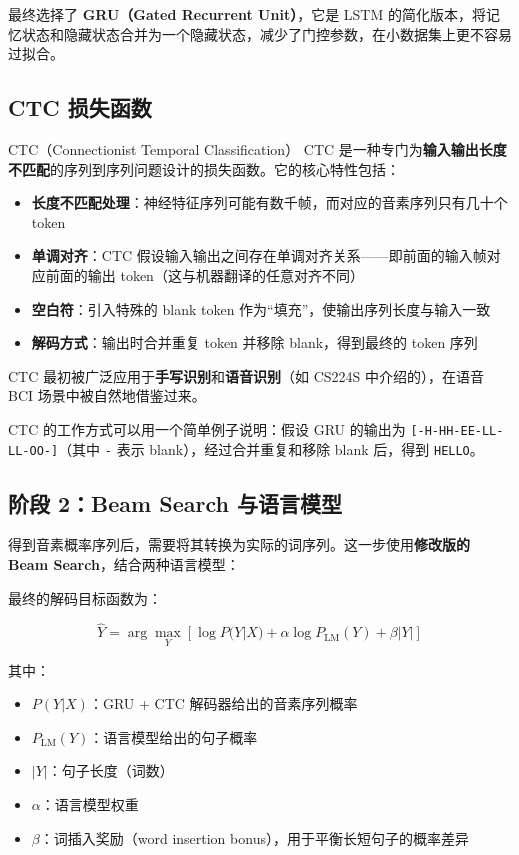 \documentclass[a4paper]{article}
\begin{document}
最终选择了 \textbf{GRU（Gated Recurrent Unit）}，它是 LSTM 的简化版本，将记忆状态和隐藏状态合并为一个隐藏状态，减少了门控参数，在小数据集上更不容易过拟合。

\subsection{CTC 损失函数}

\begin{knowledgebox}{CTC（Connectionist Temporal Classification）}
CTC 是一种专门为\textbf{输入输出长度不匹配}的序列到序列问题设计的损失函数。它的核心特性包括：

\begin{itemize}
    \item \textbf{长度不匹配处理}：神经特征序列可能有数千帧，而对应的音素序列只有几十个 token
    \item \textbf{单调对齐}：CTC 假设输入输出之间存在单调对齐关系——即前面的输入帧对应前面的输出 token（这与机器翻译的任意对齐不同）
    \item \textbf{空白符}：引入特殊的 blank token 作为``填充''，使输出序列长度与输入一致
    \item \textbf{解码方式}：输出时合并重复 token 并移除 blank，得到最终的 token 序列
\end{itemize}

CTC 最初被广泛应用于\textbf{手写识别}和\textbf{语音识别}（如 CS224S 中介绍的），在语音 BCI 场景中被自然地借鉴过来。
\end{knowledgebox}

CTC 的工作方式可以用一个简单例子说明：假设 GRU 的输出为 \texttt{[-H-HH-EE-LL-LL-OO-]}（其中 \texttt{-} 表示 blank），经过合并重复和移除 blank 后，得到 \texttt{HELLO}。

\subsection{阶段 2：Beam Search 与语言模型}

得到音素概率序列后，需要将其转换为实际的词序列。这一步使用\textbf{修改版的 Beam Search}，结合两种语言模型：

最终的解码目标函数为：

$$\hat{Y} = \arg\max_Y \left[ \log P(Y|X) + \alpha \log P_{\text{LM}}(Y) + \beta |Y| \right]$$

其中：
\begin{itemize}
    \item $P(Y|X)$：GRU + CTC 解码器给出的音素序列概率
    \item $P_{\text{LM}}(Y)$：语言模型给出的句子概率
    \item $|Y|$：句子长度（词数）
    \item $\alpha$：语言模型权重
    \item $\beta$：词插入奖励（word insertion bonus），用于平衡长短句子的概率差异
\end{itemize}
\end{document}

